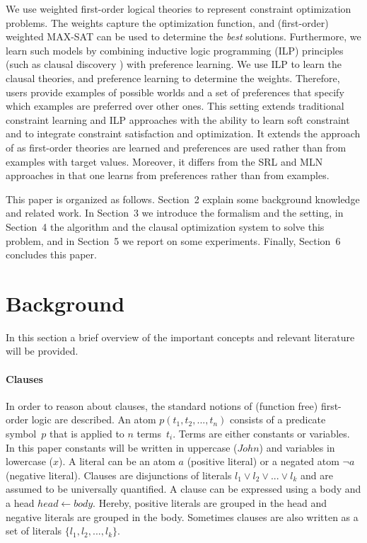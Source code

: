 \documentclass[letterpaper]{article}
\theoremstyle{definition}
\begin{document}
We use weighted first-order logical theories to represent constraint optimization problems.
The weights capture the optimization function, and (first-order) weighted MAX-SAT can be used to determine the \emph{best} solutions.
Furthermore, we learn such models by combining inductive logic programming (ILP) principles (such as clausal discovery \cite{DeRaedt:ClausalDiscovery}) with preference learning.
We use ILP to learn the clausal theories, and preference learning to determine the weights.
Therefore, users provide examples of possible worlds and a set of preferences that specify which examples are preferred over other ones.
This setting extends traditional constraint learning and ILP approaches with the ability to learn soft constraint and to integrate constraint satisfaction and optimization.
It extends the approach of \cite{campigotto2011active} as first-order theories are learned and preferences are used rather than from examples with target values.
Moreover, it differs from the SRL and MLN approaches in that one learns from preferences rather than from examples.

This paper is organized as follows.
Section~2 explain some background knowledge and related work.
In Section~3 we introduce the formalism and the setting, in Section~4 the algorithm and the clausal optimization system to solve this problem, and in Section~5 we report on some experiments.
Finally, Section~6 concludes this paper.


\section{Background}
In this section a brief overview of the important concepts and relevant literature will be provided.

\paragraph{Clauses}
In order to reason about clauses, the standard notions of (function free) first-order logic are described.
An atom $p(t_1, t_2, ..., t_n)$ consists of a predicate symbol~$p$ that is applied to $n$ terms~$t_i$.
Terms are either constants or variables.
In this paper constants will be written in uppercase ($\mathit{John}$) and variables in lowercase ($\mathit{x}$).
A literal can be an atom $a$ (positive literal) or a negated atom $\lnot a$ (negative literal).
Clauses are disjunctions of literals $l_1 \lor l_2 \lor ... \lor l_k$ and are assumed to be universally quantified.
A clause can be expressed using a body and a head $\mathit{head} \leftarrow \mathit{body}$.
Hereby, positive literals are grouped in the head and negative literals are grouped in the body.
Sometimes clauses are also written as a set of literals $\{l_1, l_2, ..., l_k\}$.
\end{document}

